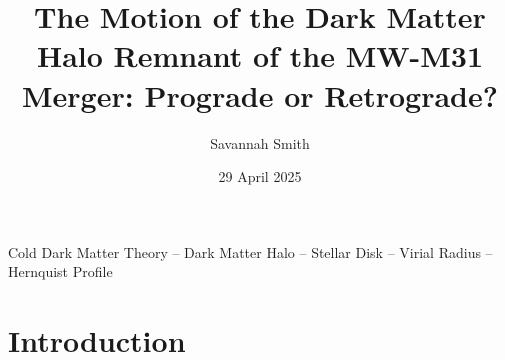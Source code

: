\documentclass[fleqn,usenatbib]{mnras}
\title{The Motion of the Dark Matter Halo Remnant of the MW-M31 Merger: Prograde or Retrograde?}
\author{Savannah Smith}
\date{29 April 2025}
\begin{document}
\label{firstpage}
\pagerange{\pageref{firstpage}--\pageref{lastpage}}
\maketitle

\begin{keywords}
Cold Dark Matter Theory -- Dark Matter Halo -- Stellar Disk -- Virial Radius -- Hernquist Profile
\end{keywords}



\section{Introduction}
\end{document}

